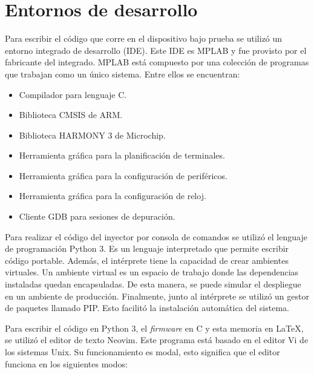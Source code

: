 \newpage

\section{Entornos de desarrollo}
\label{sec:entornos}

Para escribir el código que corre en el dispositivo bajo prueba se utilizó un entorno integrado de desarrollo (IDE).
Este IDE es MPLAB y fue provisto por el fabricante del integrado.
MPLAB está compuesto por una colección de programas que trabajan como un único sistema.
Entre ellos se encuentran:

\begin{itemize}
    \item Compilador para lenguaje C.
    \item Biblioteca CMSIS de ARM.
    \item Biblioteca HARMONY 3 de Microchip.
    \item Herramienta gráfica para la planificación de terminales.
    \item Herramienta gráfica para la configuración de periféricos.
    \item Herramienta gráfica para la configuración de reloj.
    \item Cliente GDB para sesiones de depuración.
\end{itemize}

Para realizar el código del inyector por consola de comandos se utilizó el lenguaje de programación Python 3.
Es un lenguaje interpretado que permite escribir código portable.
Además, el intérprete tiene la capacidad de crear ambientes virtuales.
Un ambiente virtual es un espacio de trabajo donde las dependencias instaladas quedan encapsuladas.
De esta manera, se puede simular el despliegue en un ambiente de producción.
Finalmente, junto al intérprete se utilizó un gestor de paquetes llamado PIP.
Esto facilitó la instalación automática del sistema.

Para escribir el código en Python 3, el \emph{firmware} en C y esta memoria en \LaTeX, se utilizó el editor de texto Neovim.
Este programa está basado en el editor Vi de los sistemas Unix.
Su funcionamiento es modal, esto significa que el editor funciona en los siguientes modos:

